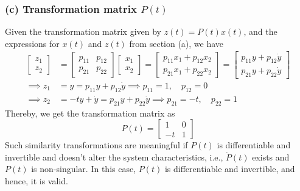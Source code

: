 \subsubsection*{(c) Transformation matrix \( P(t) \)}

Given the transformation matrix given by \( z(t) = P(t)x(t) \), and the expressions for \( x(t) \) and \( z(t) \) from section (a), we have
\begin{align*}
    \begin{bmatrix}
        z_1 \\
        z_2
    \end{bmatrix}
     & =
    \begin{bmatrix}
        p_{11} & p_{12} \\
        p_{21} & p_{22}
    \end{bmatrix}
    \begin{bmatrix}
        x_1 \\
        x_2
    \end{bmatrix}
    =
    \begin{bmatrix}
        p_{11} x_1 + p_{12} x_2 \\
        p_{21} x_1 + p_{22} x_2
    \end{bmatrix}
    =
    \begin{bmatrix}
        p_{11} y + p_{12} \dot y \\
        p_{21} y + p_{22} \dot y
    \end{bmatrix}
    \\
    \implies
    z_1
     & =
    y
    =
    p_{11} y + p_{12} \dot y
    \implies
    p_{11} = 1, \quad p_{12} = 0
    \\
    \implies
    z_2
     & =
    -t y + \dot y
    =
    p_{21} y + p_{22} \dot y
    \implies
    p_{21} = -t, \quad p_{22} = 1
\end{align*}
Thereby, we get the transformation matrix as
\begin{equation*}
    \boxed{
        P(t)
        =
        \begin{bmatrix}
            1  & 0 \\
            -t & 1
        \end{bmatrix}
    }
\end{equation*}
Such similarity transformations are meaningful if \( P(t) \) is differentiable and invertible and doesn't alter the system characteristics, i.e., \( \dot P(t) \) exists and \( P(t) \) is non-singular.
In this case, \( P(t) \) is differentiable and invertible, and hence, it is valid.

